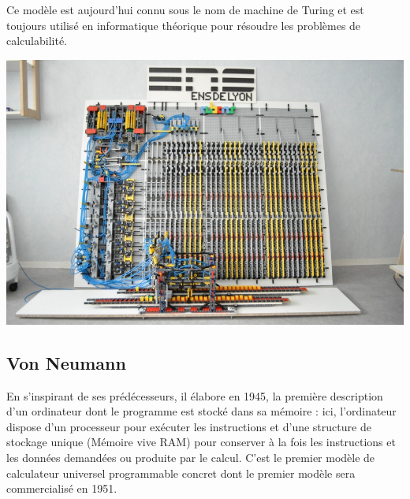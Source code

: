 \documentclass[a4paper,10pt]{report}
\theoremstyle{exo}
\theoremstyle{exercice}
\begin{document}
Ce modèle est aujourd'hui connu sous le nom de machine de Turing et est toujours utilisé en informatique théorique pour résoudre les problèmes de calculabilité. 

\begin{center}\href{https://videotheque.cnrs.fr/index.php?id_doc=3001&urlaction=doc}{\includegraphics[width=0.9\linewidth]{image/Lego_Turing_Machine.jpg}}\end{center}

\subsection{Von Neumann}
En s'inspirant de ses prédécesseurs, il élabore en 1945, la première description d'un ordinateur dont le programme est stocké dans sa mémoire : ici, l'ordinateur dispose d'un processeur pour exécuter les instructions et d'une structure de stockage unique (Mémoire vive RAM) pour conserver à la fois les instructions et les données demandées ou
produite par le calcul. C'est le premier modèle de calculateur universel programmable concret dont le premier modèle sera commercialisé en 1951.
\end{document}
